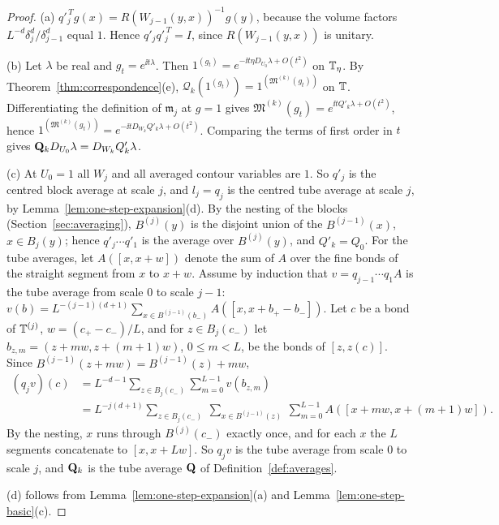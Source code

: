 \begin{proof}
(a) $q'^{\,T}_jg(x)=R(W_{j-1}(y,x))^{-1}g(y)$, because the volume factors $L^{-d}\delta_j^d/\delta_{j-1}^d$ equal $1$. Hence $q'_jq'^{\,T}_j=I$, since $R(W_{j-1}(y,x))$ is unitary.

(b) Let $\lambda$ be real and $g_t=e^{\ii t\lambda}$. Then $1^{(g_t)}=e^{-\ii t\eta D_{U_0}\lambda+O(t^2)}$ on $\mathbb T_\eta$. By Theorem~\ref{thm:correspondence}(e), $\mathcal Q_k(1^{(g_t)})=1^{(\mathfrak M^{(k)}(g_t))}$ on $\mathbb T$. Differentiating the definition of $\mathfrak m_j$ at $g=1$ gives $\mathfrak M^{(k)}(g_t)=e^{\ii tQ'_k\lambda+O(t^2)}$, hence $1^{(\mathfrak M^{(k)}(g_t))}=e^{-\ii tD_{W_k}Q'_k\lambda+O(t^2)}$. Comparing the terms of first order in $t$ gives $\mathbf Q_kD_{U_0}\lambda=D_{W_k}Q'_k\lambda$.

(c) At $U_0=1$ all $W_j$ and all averaged contour variables are $1$. So $q'_j$ is the centred block average at scale $j$, and $l_j=q_j$ is the centred tube average at scale $j$, by Lemma~\ref{lem:one-step-expansion}(d). By the nesting of the blocks (Section~\ref{sec:averaging}), $B^{(j)}(y)$ is the disjoint union of the $B^{(j-1)}(x)$, $x\in B_j(y)$; hence $q'_j\cdots q'_1$ is the average over $B^{(j)}(y)$, and $Q'_k=Q_0$. For the tube averages, let $A([x,x+w])$ denote the sum of $A$ over the fine bonds of the straight segment from $x$ to $x+w$. Assume by induction that $v=q_{j-1}\cdots q_1A$ is the tube average from scale $0$ to scale $j-1$: $v(b)=L^{-(j-1)(d+1)}\sum_{x\in B^{(j-1)}(b_-)}A([x,x+b_+-b_-])$. Let $c$ be a bond of $\mathbb T^{(j)}$, $w=(c_+-c_-)/L$, and for $z\in B_j(c_-)$ let $b_{z,m}=(z+mw,z+(m+1)w)$, $0\le m<L$, be the bonds of $[z,z(c)]$. Since $B^{(j-1)}(z+mw)=B^{(j-1)}(z)+mw$,
\[
\begin{aligned}
(q_jv)(c)&=L^{-d-1}\sum_{z\in B_j(c_-)}\sum_{m=0}^{L-1}v(b_{z,m})\\
&=L^{-j(d+1)}\sum_{z\in B_j(c_-)}\ \sum_{x\in B^{(j-1)}(z)}\ \sum_{m=0}^{L-1}A([x+mw,x+(m+1)w]).
\end{aligned}
\]
By the nesting, $x$ runs through $B^{(j)}(c_-)$ exactly once, and for each $x$ the $L$ segments concatenate to $[x,x+Lw]$. So $q_jv$ is the tube average from scale $0$ to scale $j$, and $\mathbf Q_k$ is the tube average $\mathbf Q$ of Definition~\ref{def:averages}.

(d) follows from Lemma~\ref{lem:one-step-expansion}(a) and Lemma~\ref{lem:one-step-basic}(c).


\end{proof}
